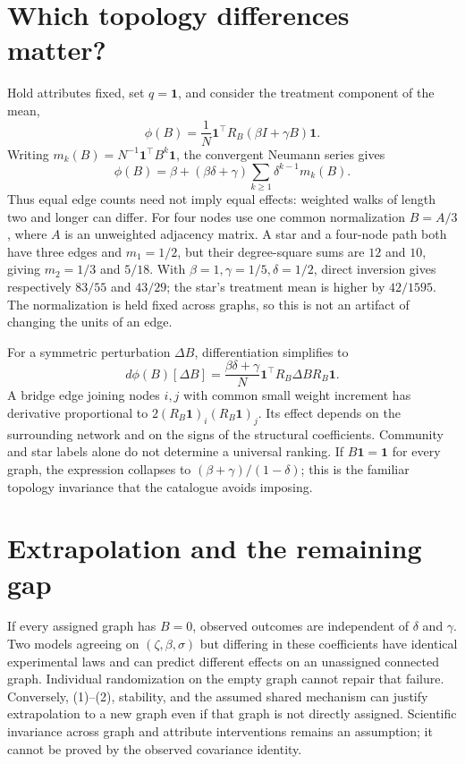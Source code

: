 \documentclass[11pt]{article}
\begin{document}
\section*{Which topology differences matter?}
Hold attributes fixed, set $q=\mathbf1$, and consider the treatment component of the mean,
\[
 \phi(B)=\frac1N\mathbf1^\top R_B(\beta I+\gamma B)\mathbf1.
\]
Writing $m_k(B)=N^{-1}\mathbf1^\top B^k\mathbf1$, the convergent Neumann series gives
\[
 \phi(B)=\beta+(\beta\delta+\gamma)
 \sum_{k\geq1}\delta^{k-1}m_k(B).
\]
Thus equal edge counts need not imply equal effects: weighted walks of length two and longer can differ. For four nodes use one common normalization $B=A/3$, where $A$ is an unweighted adjacency matrix. A star and a four-node path both have three edges and $m_1=1/2$, but their degree-square sums are $12$ and $10$, giving $m_2=1/3$ and $5/18$. With $\beta=1,\gamma=1/5,\delta=1/2$, direct inversion gives respectively $83/55$ and $43/29$; the star's treatment mean is higher by $42/1595$. The normalization is held fixed across graphs, so this is not an artifact of changing the units of an edge.

For a symmetric perturbation $\Delta B$, differentiation simplifies to
\[
 d\phi(B)[\Delta B]=\frac{\beta\delta+\gamma}{N}
 \mathbf1^\top R_B\Delta B R_B\mathbf1.
\]
A bridge edge joining nodes $i,j$ with common small weight increment has derivative proportional to $2(R_B\mathbf1)_i(R_B\mathbf1)_j$. Its effect depends on the surrounding network and on the signs of the structural coefficients. Community and star labels alone do not determine a universal ranking. If $B\mathbf1=\mathbf1$ for every graph, the expression collapses to $(\beta+\gamma)/(1-\delta)$; this is the familiar topology invariance that the catalogue avoids imposing.

\section*{Extrapolation and the remaining gap}
If every assigned graph has $B=0$, observed outcomes are independent of $\delta$ and $\gamma$. Two models agreeing on $(\zeta,\beta,\sigma)$ but differing in these coefficients have identical experimental laws and can predict different effects on an unassigned connected graph. Individual randomization on the empty graph cannot repair that failure. Conversely, (1)--(2), stability, and the assumed shared mechanism can justify extrapolation to a new graph even if that graph is not directly assigned. Scientific invariance across graph and attribute interventions remains an assumption; it cannot be proved by the observed covariance identity.
\end{document}
